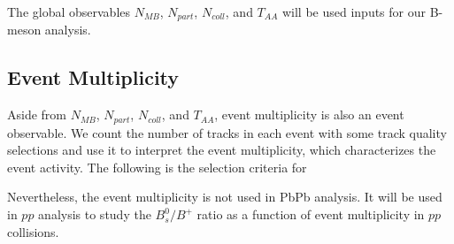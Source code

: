 The global observables $N_{MB}$, $N_{part}$, $N_{coll}$, and $T_{AA}$ will be used inputs for our B-meson analysis. 

\subsection{Event Multiplicity}

Aside from $N_{MB}$, $N_{part}$, $N_{coll}$, and $T_{AA}$, event multiplicity is also an event observable. We count the number of tracks in each event with some track quality selections and use it to interpret the event multiplicity, which characterizes the event activity. The following is the selection criteria for 

Nevertheless, the event multiplicity is not used in PbPb analysis. It will be used in $pp$ analysis to study the $B^0_s/B^+$ ratio as a function of event multiplicity in $pp$ collisions.






